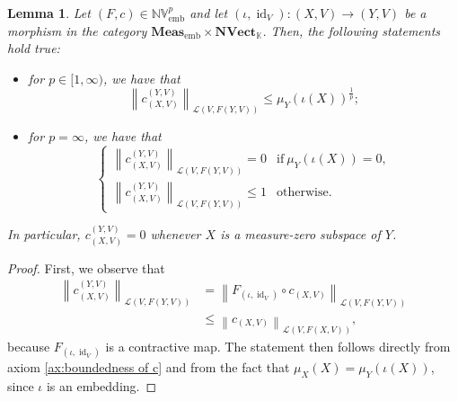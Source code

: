 \documentclass{amsart}
\theoremstyle{definition}
\theoremstyle{plain}
\newtheorem{lemma}[definition]{Lemma}
\newcommand{\norm}[1]{\left\lVert #1\right\rVert} %
\newcommand{\id}{\operatorname{id}}
\newcommand{\embMeas}{\mathbf{Meas}_\mathrm{emb}}
\newcommand{\NVect}{\mathbf{NVect}_{\mathbb{K}}}
\newcommand{\NVembp}{\mathbb{NV}_{\mathrm{emb}}^p}
\begin{document}
        \begin{lemma}
        \label{lemma:compatibility of c with embeddings in the normed case}
            Let $(F,c) \in \NVembp$ and let $(\iota,\id_V) \colon (X,V) \rightarrow (Y,V)$ be a morphism in the category $\embMeas \times \NVect$. 
            Then, the following statements hold true:
            \begin{itemize}
                \item[(i)] for $p \in [1,\infty)$, we have that
                \begin{equation*}
                    \norm{c_{(X,V)}^{(Y,V)}}_{\mathcal{L}(V,F(Y,V))} \leq \mu_Y\left( \iota(X) \right)^\frac{1}{p}; 
                \end{equation*}
                \item[(ii)] for $p = \infty$, we have that 
                \begin{equation*} 
                    \begin{cases}
                        \norm{c_{(X,V)}^{(Y,V)}}_{\mathcal{L}(V,F(Y,V))} = 0   & \text{if} ~ \mu_Y\left( \iota(X) \right) = 0, \\
                        \norm{c_{(X,V)}^{(Y,V)}}_{\mathcal{L}(V,F(Y,V))} \leq 1   & \text{otherwise.}
                    \end{cases}
                \end{equation*}
            \end{itemize}
            In particular, $c_{(X,V)}^{(Y,V)} = 0$ whenever $X$ is a measure-zero subspace of $Y$. 
        \end{lemma}

        \begin{proof}
            First, we observe that
            \begin{equation*}
                \begin{split}
                    \norm{c_{(X,V)}^{(Y,V)}}_{\mathcal{L}(V,F(Y,V))} &= \norm{F_{(\iota,\id_V)} \circ c_{(X,V)}}_{\mathcal{L}(V,F(Y,V))} \\
                    &\leq \norm{c_{(X,V)}}_{\mathcal{L}(V,F(X,V))},
                \end{split}
            \end{equation*}
            because $F_{(\iota,\id_V)}$ is a contractive map. 
            The statement then follows directly from axiom \ref{ax:boundedness of c} and from the fact that $\mu_X(X) = \mu_Y\left( \iota(X) \right)$, since $\iota$ is an embedding. 
        \end{proof}
        
\end{document}
